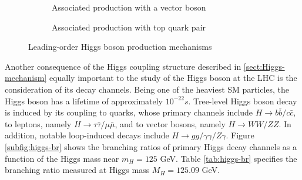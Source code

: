 \begin{figure}[h]
\begin{subfigure}[b]{0.48\textwidth}
        \caption{Associated production with a vector boson}
        \label{subfig:VH-higgs}
    \end{subfigure}
    \begin{subfigure}[b]{0.48\textwidth}
        \centering
        \caption{Associated production with top quark pair}
        \label{subfig:ttH-signature}
    \end{subfigure}
    \caption{Leading-order Higgs boson production mechanisms}
    \label{fig:higgs-production}
\end{figure} 

Another consequence of the Higgs coupling structure described in \ref{sect:Higgs-mechanism} equally important to the study of the Higgs boson at the LHC is the consideration of its decay channels. 
Being one of the heaviest SM particles, the Higgs boson has a lifetime of approximately $10^{-22}s$. 
Tree-level Higgs boson decay is induced by its coupling to quarks, whose primary channels include $H\rightarrow b\bar{b}/c\bar{c}$, to leptons, namely $H\rightarrow \tau\bar{\tau}/\mu\bar{\mu}$, and to vector bosons, namely $H\rightarrow WW/ZZ$. 
In addition, notable loop-induced decays include $H\rightarrow gg/\gamma\gamma/Z\gamma$. Figure \ref{subfig:higgs-br} shows the branching ratios of primary Higgs decay channels as a function of the Higgs mass near $m_H=125$ GeV. Table \ref{tab:higgs-br} specifies the branching ratio measured at Higgs mass $M_H=125.09$ GeV.

